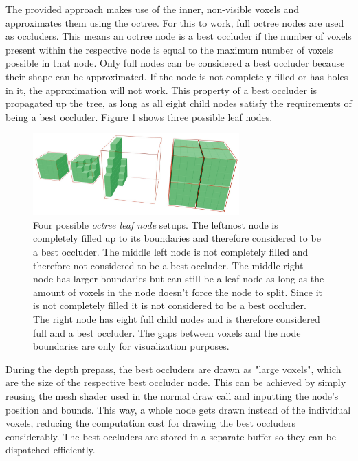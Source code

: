 \noindent
The provided approach makes use of the inner, non-visible voxels and approximates them using the octree. For this 
to work, full octree nodes are used as occluders. This means an octree node is a best occluder if the number of 
voxels present within the respective node is equal to the maximum number of voxels possible in that node. Only full 
nodes can be considered a best occluder because their shape can be approximated. If the node is not completely filled 
or has holes in it, the approximation will not work. This property of a best occluder is propagated up the tree, as 
long as all eight child nodes satisfy the requirements of being a best occluder. Figure 
\ref{fig:octreenode-filled-non-filled} shows three possible leaf nodes. 

\begin{figure}[h]
    \centering
    \includegraphics[width=300px]{images/graphics/octree-nodes-filled.jpg}
    \caption{Four possible \emph{octree leaf node} setups. The leftmost node is completely filled up to its 
    boundaries and therefore considered to be a best occluder. The middle left node is not completely filled 
    and therefore not considered to be a best occluder. The middle right node has larger boundaries but can 
    still be a leaf node as long as the amount of voxels in the node doesn't force the node to split. Since 
    it is not completely filled it is not considered to be a best occluder. The right node has eight full child 
    nodes and is therefore considered full and a best occluder. The gaps between voxels and the node boundaries 
    are only for visualization purposes.}
    \label{fig:octreenode-filled-non-filled}
\end{figure}

\noindent
During the depth prepass, the best occluders are drawn as "large voxels", which are the size of the respective 
best occluder node. This can be achieved by simply reusing the mesh shader used in the normal draw call and 
inputting the node's position and bounds. This way, a whole node gets drawn instead of the individual voxels, 
reducing the computation cost for drawing the best occluders considerably. The best occluders are stored in a 
separate buffer so they can be dispatched efficiently. \\

